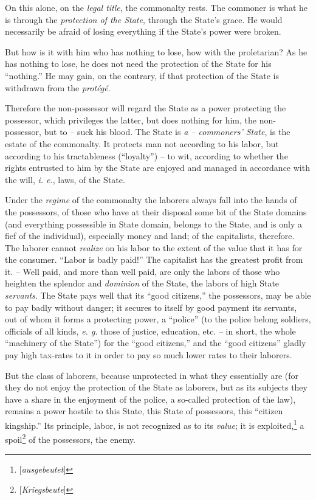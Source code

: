 \documentclass[12pt,a4paper]{book}
\begin{document}
On this alone, on the \textit{legal title}, the commonalty rests. The commoner 
is what he is through the \textit{protection of the State}, through the 
State's grace. He would necessarily be afraid of losing everything if the 
State's power were broken.

But how is it with him who has nothing to lose, how with the proletarian? As 
he has nothing to lose, he does not need the protection of the State for his 
``nothing.'' He may gain, on the contrary, if that protection of the State 
is withdrawn from the \textit{prot\'eg\'e}.

Therefore the non-possessor will regard the State as a power protecting the 
possessor, which privileges the latter, but does nothing for him, the 
non-possessor, but to -- suck his blood. The State is \textit{a -- commoners' 
State}, is the estate of the commonalty. It protects man not according to his 
labor, but according to his tractableness (``loyalty'') -- to wit, according 
to whether the rights entrusted to him by the State are enjoyed and managed in 
accordance with the will, \textit{i. e.}, laws, of the State.

Under the \textit{regime} of the commonalty the laborers always fall into the 
hands of the possessors, of those who have at their disposal some bit of the 
State domains (and everything possessible in State domain, belongs to the 
State, and is only a fief of the individual), especially money and land; of 
the capitalists, therefore. The laborer cannot \textit{realize} on his labor 
to the extent of the value that it has for the consumer. ``Labor is badly 
paid!'' The capitalist has the greatest profit from it. -- Well paid, and 
more than well paid, are only the labors of those who heighten the splendor 
and \textit{dominion} of the State, the labors of high State 
\textit{servants}. The State pays well that its ``good citizens,'' the 
possessors, may be able to pay badly without danger; it secures to itself by 
good payment its servants, out of whom it forms a protecting power, a 
``police'' (to the police belong soldiers, officials of all kinds, 
\textit{e. g.} those of justice, education, etc. -- in short, the whole 
``machinery of the State'') for the ``good citizens,'' and the ``good 
citizens'' gladly pay high tax-rates to it in order to pay so much lower 
rates to their laborers.

But the class of laborers, because unprotected in what they essentially are 
(for they do not enjoy the protection of the State as laborers, but as its 
subjects they have a share in the enjoyment of the police, a so-called 
protection of the law), remains a power hostile to this State, this State of 
possessors, this ``citizen kingship.'' Its principle, labor, is not 
recognized as to its \textit{value}; it is 
exploited,\footnote{[\textit{ausgebeutet}]} a 
spoil\footnote{[\textit{Kriegsbeute}]} of the possessors, the enemy.
\end{document}
